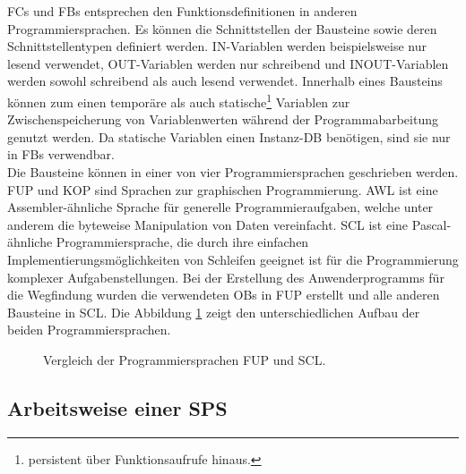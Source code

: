			\ac{FC}s und \ac{FB}s entsprechen den Funktionsdefinitionen in anderen Programmiersprachen. Es können die Schnittstellen der Bausteine sowie deren Schnittstellentypen definiert werden. IN-Variablen werden beispielsweise nur lesend verwendet, OUT-Variablen werden nur schreibend und INOUT-Variablen werden sowohl schreibend als auch lesend verwendet. Innerhalb eines Bausteins können zum einen temporäre als auch statische\footnote{persistent über Funktionsaufrufe hinaus.} Variablen zur Zwischenspeicherung von Variablenwerten während der Programmabarbeitung genutzt werden. Da statische Variablen einen Instanz-\ac{DB} benötigen, sind sie nur in \ac{FB}s verwendbar.
			\\[4pt]
			Die Bausteine können in einer von vier Programmiersprachen geschrieben werden. \ac{FUP} und \ac{KOP} sind Sprachen zur graphischen Programmierung. \ac{AWL} ist eine Assembler-ähnliche Sprache für generelle Programmieraufgaben, welche unter anderem die byteweise Manipulation von Daten vereinfacht. \ac{SCL} ist eine Pascal-ähnliche Programmiersprache, die durch ihre einfachen Implementierungsmöglichkeiten von Schleifen geeignet ist für die Programmierung komplexer Aufgabenstellungen. Bei der Erstellung des Anwenderprogramms für die Wegfindung wurden die verwendeten \ac{OB}s in \ac{FUP} erstellt und alle anderen Bausteine in SCL. Die Abbildung \ref{Vergleich FUPSCL} zeigt den unterschiedlichen Aufbau der beiden Programmiersprachen.
			
			\begin{figure}[h]
				\begin{center}
				\end{center}
				\caption{Vergleich der Programmiersprachen FUP und SCL.}\label{Vergleich FUPSCL}
			\end{figure}
			
	
		\subsection{Arbeitsweise einer SPS}
			

